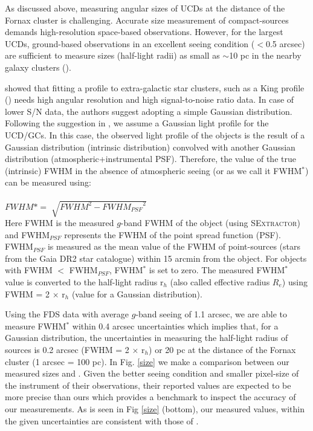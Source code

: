 \documentclass[fleqn,usenatbib]{mnras}
\begin{document}
As discussed above, measuring angular sizes of UCDs at the distance of the Fornax cluster is challenging. Accurate size measurement of compact-sources demands high-resolution space-based observations. However, for the largest UCDs, ground-based observations in an excellent seeing condition ($<$0.5 arcsec) are sufficient to measure sizes (half-light radii) as small as $\sim$10 pc in the nearby galaxy clusters (\citealp{richtler2005,voggel-2016,Liu-2020}).

\citet{andres} showed that fitting a profile to extra-galactic star clusters, such as a King profile (\citealp{king}) needs high angular resolution and high signal-to-noise ratio data.
In case of lower S/N data, the authors suggest adopting a simple Gaussian distribution. Following the suggestion in \citet{andres}, we assume a Gaussian light profile for the UCD/GCs. In this case, the observed light profile of the objects is the result of a Gaussian distribution (intrinsic distribution) convolved with another Gaussian distribution (atmospheric+instrumental PSF). Therefore, the value of the true (intrinsic) FWHM in the absence of atmospheric seeing (or as we call it FWHM$^*$) can be measured using:\\\\
$FWHM* = \sqrt[]{{FWHM }^2 - {FWHM_{PSF}}^2}$
\\

Here FWHM is the measured $g$-band FWHM of the object (using \textsc{SExtractor}) and FWHM$_{PSF}$ represents the FWHM of the point spread function (PSF). FWHM$_{PSF}$ is measured as the mean value of the FWHM of point-sources (stars from the Gaia DR2 star catalogue) within 15 arcmin from the object. For objects with FWHM $<$ FWHM$_{PSF}$, FWHM$^*$ is set to zero. The measured FWHM$^*$ value is converted to the half-light radius r$_h$ (also called effective radius $R_e$) using FWHM = 2 $\times$ r$_h$ (value for a Gaussian distribution).

Using the FDS data with average $g$-band seeing of 1.1 arcsec, we are able to measure FWHM$^*$ within 0.4 arcsec uncertainties which implies that, for a Gaussian distribution, the uncertainties in measuring the half-light radius of sources is 0.2 arcsec (FWHM = 2 $\times$ r$_h$) or 20 pc at the distance of the Fornax cluster (1 arcsec = 100 pc). In Fig. \ref{size} we make a comparison between our measured sizes and \citet{voggel-2016}. Given the better seeing condition and smaller pixel-size of the instrument of their observations, their reported values are expected to be more precise than ours which provides a benchmark to inspect the accuracy of our measurements. As is seen in Fig \ref{size} (bottom), our measured values, within the given uncertainties are consistent with those of \citet{voggel-2016}.
\end{document}
